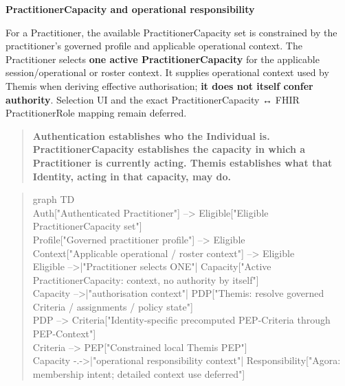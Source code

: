 \par\medskip\textbf{PractitionerCapacity and operational responsibility}\par


For a Practitioner, the available PractitionerCapacity set is constrained by
the practitioner's governed profile and applicable operational context. The
Practitioner selects \textbf{one active PractitionerCapacity} for the applicable
session/operational or roster context. It supplies operational context used by
Themis when deriving effective authorisation; \textbf{it does not itself confer authority}.
Selection UI and the exact PractitionerCapacity ↔ FHIR PractitionerRole mapping
remain deferred.



\begin{quote}


\textbf{Authentication establishes who the Individual is. PractitionerCapacity
establishes the capacity in which a Practitioner is currently acting. Themis
establishes what that Identity, acting in that capacity, may do.}



\end{quote}


\begin{quote}\small\ttfamily
graph TD\\
    Auth["Authenticated Practitioner"] --> Eligible["Eligible PractitionerCapacity set"]\\
    Profile["Governed practitioner profile"] --> Eligible\\
    Context["Applicable operational / roster context"] --> Eligible\\
    Eligible -->|"Practitioner selects ONE"| Capacity["Active PractitionerCapacity: context, no authority by itself"]\\
    Capacity -->|"authorisation context"| PDP["Themis: resolve governed Criteria / assignments / policy state"]\\
    PDP --> Criteria["Identity-specific precomputed PEP-Criteria through PEP-Context"]\\
    Criteria --> PEP["Constrained local Themis PEP"]\\
    Capacity -.->|"operational responsibility context"| Responsibility["Agora: membership intent; detailed context use deferred"]\\

\end{quote}



